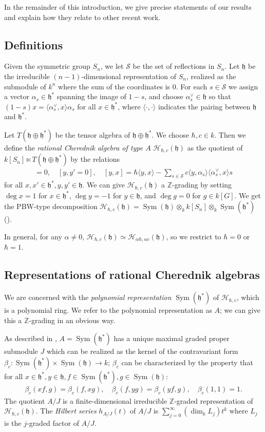 \documentclass{amsart}
\numberwithin{equation}{section}
\theoremstyle{definition}
\newcommand{\h}{\mathfrak{h}}
\newcommand{\HH}{\mathcal{H}}
\newcommand{\Sym}{\operatorname{Sym}}
\begin{document}
In the remainder of this introduction, we give precise statements of our results and explain how they relate to other recent work.

\subsection{Definitions}

Given the symmetric group $S_n$, we let $\mathcal{S}$ be the set of reflections in $S_n$. Let $\h$ be the irreducible $(n-1)$-dimensional representation of $S_n$, realized as the submodule of $k^n$ where the sum of the coordinates is $0$. For each $s \in \mathcal{S}$ we assign a vector $\alpha_s \in \h^*$ spanning the image of $1-s$, and choose $\alpha_s^\vee \in \h$ so that $(1-s)x=\langle \alpha_s^\vee,x\rangle \alpha_s$ for all $x \in \h^*$, where $\langle \cdot,\cdot\rangle$ indicates the pairing between $\h$ and $\h^*$. 

Let $T(\h \oplus \h^*)$ be the tensor algebra of $\h \oplus \h^*$. We choose $\hbar,c \in k$. Then we define the {\it rational Cherednik algebra of type $A$} $\HH_{\hbar,c}(\h)$ as the quotient of $k[S_n] \ltimes T(\h \oplus \h^*)$ by the relations
\begin{align*}
[x,x']=0, \quad [y,y' = 0], \quad [y,x] = \hbar\langle y,x\rangle - \sum_{s \in \mathcal{S}} c\langle y,\alpha_s\rangle\langle \alpha_s^\vee,x\rangle s
\end{align*}
 for all $x,x' \in \h^*, y,y' \in \h$. We can give $\HH_{\hbar,c}(\h)$ a $\mathbb{Z}$-grading by setting $\deg x=1$ for $x \in \h^*$, $\deg y = -1$ for $y \in \h$, and $\deg g=0$ for $g \in k[G]$. We get the PBW-type decomposition $\HH_{\hbar,c}(\h)=\Sym(\h) \otimes_k k[S_n] \otimes_k \Sym(\h^*)$ (\cite[Section 3.2]{EM}). 

In general, for any $\alpha \ne 0$, $\HH_{\hbar,c}(\h)\simeq \HH_{\alpha\hbar,\alpha c}(\h)$, so we restrict to $\hbar=0$ or $\hbar = 1$. 

\subsection{Representations of rational Cherednik algebras}

We are concerned with the {\it polynomial representation} $\Sym(\h^*)$ of $\HH_{\hbar,c}$, which is a polynomial ring. We refer to the polynomial representation as $A$; we can give this a $\mathbb{Z}$-grading in an obvious way. 

As described in \cite[Section 2.5]{BC1}, $A=\Sym(\h^*)$ has a unique maximal graded proper submodule $J$ which can be realized as the kernel of the contravariant form $\beta_c: \Sym(\h^*) \times \Sym(\h) \to k$; $\beta_c$ can be characterized by the property that for all $x \in \h^*, y \in \h, f \in \Sym(\h^*), g \in  \Sym(\h)$:
\begin{align*}
\beta_c(xf,g)=\beta_c(f,xg), \quad \beta_c(f,yg) = \beta_c(yf,g), \quad \beta_c(1,1) = 1.
\end{align*}
The quotient $A/J$ is a finite-dimensional irreducible $\mathbb{Z}$-graded representation of $\HH_{\hbar,c}(\h)$. The {\it Hilbert series} $h_{A/J}(t)$ of $A/J$ is $\sum_{j=0}^\infty (\dim_k L_j)t^k$ where $L_j$ is the $j$-graded factor of $A/J$. 
\end{document}
